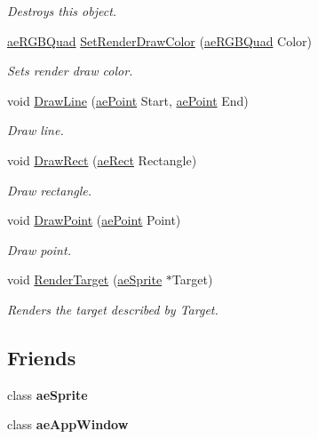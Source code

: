 \begin{DoxyCompactItemize}
\begin{DoxyCompactList}\small\item\em Destroys this object. \end{DoxyCompactList}\item 
\hyperlink{structae_core_1_1ae_r_g_b_quad}{ae\+R\+G\+B\+Quad} \hyperlink{classae_core_1_1ae_renderer_a3463e48a8794b6ba83ecba3c2d8d3424}{Set\+Render\+Draw\+Color} (\hyperlink{structae_core_1_1ae_r_g_b_quad}{ae\+R\+G\+B\+Quad} Color)
\begin{DoxyCompactList}\small\item\em Sets render draw color. \end{DoxyCompactList}\item 
void \hyperlink{classae_core_1_1ae_renderer_a763bb052c5cea701ec12ab77a164ea5d}{Draw\+Line} (\hyperlink{structae_core_1_1ae_point}{ae\+Point} Start, \hyperlink{structae_core_1_1ae_point}{ae\+Point} End)
\begin{DoxyCompactList}\small\item\em Draw line. \end{DoxyCompactList}\item 
void \hyperlink{classae_core_1_1ae_renderer_ac821b51f9396c9a279dc1bcdf7744560}{Draw\+Rect} (\hyperlink{structae_core_1_1ae_rect}{ae\+Rect} Rectangle)
\begin{DoxyCompactList}\small\item\em Draw rectangle. \end{DoxyCompactList}\item 
void \hyperlink{classae_core_1_1ae_renderer_aa30f051d2ee663a9efc401fc62dcc8a9}{Draw\+Point} (\hyperlink{structae_core_1_1ae_point}{ae\+Point} Point)
\begin{DoxyCompactList}\small\item\em Draw point. \end{DoxyCompactList}\item 
void \hyperlink{classae_core_1_1ae_renderer_a5a069b5046deab1ad7cb87aa1fdb891b}{Render\+Target} (\hyperlink{classae_core_1_1ae_sprite}{ae\+Sprite} $\ast$Target)
\begin{DoxyCompactList}\small\item\em Renders the target described by Target. \end{DoxyCompactList}\end{DoxyCompactItemize}
\subsection*{Friends}
\begin{DoxyCompactItemize}
\item 
class {\bfseries ae\+Sprite}\hypertarget{classae_core_1_1ae_renderer_a450e94d8bab3fa5d26d3663ba55b8ba3}{}\label{classae_core_1_1ae_renderer_a450e94d8bab3fa5d26d3663ba55b8ba3}

\item 
class {\bfseries ae\+App\+Window}\hypertarget{classae_core_1_1ae_renderer_a663f64030555362890326e0b793c8839}{}\label{classae_core_1_1ae_renderer_a663f64030555362890326e0b793c8839}

\end{DoxyCompactItemize}


